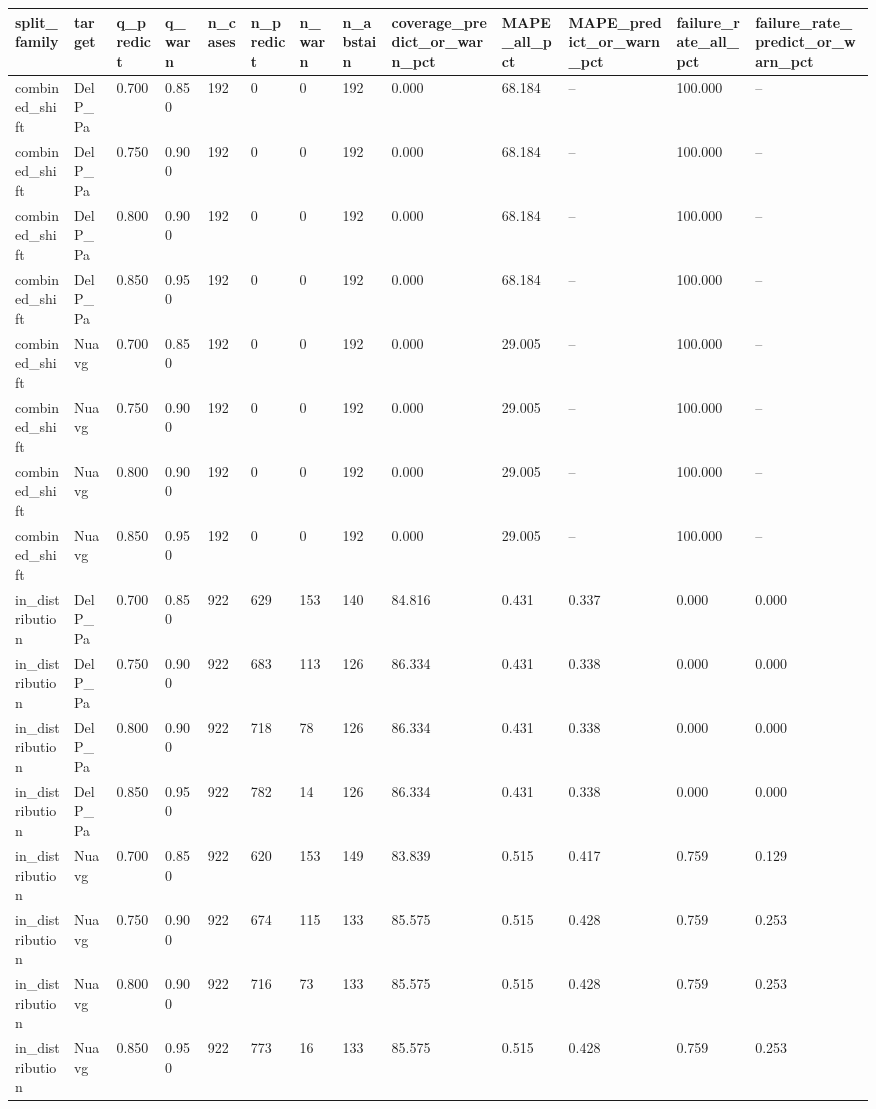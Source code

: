 \begin{tabular}{lllllllllllll}
\hline
split_family & target & q_predict & q_warn & n_cases & n_predict & n_warn & n_abstain & coverage_predict_or_warn_pct & MAPE_all_pct & MAPE_predict_or_warn_pct & failure_rate_all_pct & failure_rate_predict_or_warn_pct \\
\hline
combined_shift & DelP_Pa & 0.700 & 0.850 & 192 & 0 & 0 & 192 & 0.000 & 68.184 & -- & 100.000 & -- \\
combined_shift & DelP_Pa & 0.750 & 0.900 & 192 & 0 & 0 & 192 & 0.000 & 68.184 & -- & 100.000 & -- \\
combined_shift & DelP_Pa & 0.800 & 0.900 & 192 & 0 & 0 & 192 & 0.000 & 68.184 & -- & 100.000 & -- \\
combined_shift & DelP_Pa & 0.850 & 0.950 & 192 & 0 & 0 & 192 & 0.000 & 68.184 & -- & 100.000 & -- \\
combined_shift & Nuavg & 0.700 & 0.850 & 192 & 0 & 0 & 192 & 0.000 & 29.005 & -- & 100.000 & -- \\
combined_shift & Nuavg & 0.750 & 0.900 & 192 & 0 & 0 & 192 & 0.000 & 29.005 & -- & 100.000 & -- \\
combined_shift & Nuavg & 0.800 & 0.900 & 192 & 0 & 0 & 192 & 0.000 & 29.005 & -- & 100.000 & -- \\
combined_shift & Nuavg & 0.850 & 0.950 & 192 & 0 & 0 & 192 & 0.000 & 29.005 & -- & 100.000 & -- \\
in_distribution & DelP_Pa & 0.700 & 0.850 & 922 & 629 & 153 & 140 & 84.816 & 0.431 & 0.337 & 0.000 & 0.000 \\
in_distribution & DelP_Pa & 0.750 & 0.900 & 922 & 683 & 113 & 126 & 86.334 & 0.431 & 0.338 & 0.000 & 0.000 \\
in_distribution & DelP_Pa & 0.800 & 0.900 & 922 & 718 & 78 & 126 & 86.334 & 0.431 & 0.338 & 0.000 & 0.000 \\
in_distribution & DelP_Pa & 0.850 & 0.950 & 922 & 782 & 14 & 126 & 86.334 & 0.431 & 0.338 & 0.000 & 0.000 \\
in_distribution & Nuavg & 0.700 & 0.850 & 922 & 620 & 153 & 149 & 83.839 & 0.515 & 0.417 & 0.759 & 0.129 \\
in_distribution & Nuavg & 0.750 & 0.900 & 922 & 674 & 115 & 133 & 85.575 & 0.515 & 0.428 & 0.759 & 0.253 \\
in_distribution & Nuavg & 0.800 & 0.900 & 922 & 716 & 73 & 133 & 85.575 & 0.515 & 0.428 & 0.759 & 0.253 \\
in_distribution & Nuavg & 0.850 & 0.950 & 922 & 773 & 16 & 133 & 85.575 & 0.515 & 0.428 & 0.759 & 0.253 \\

\end{tabular}
